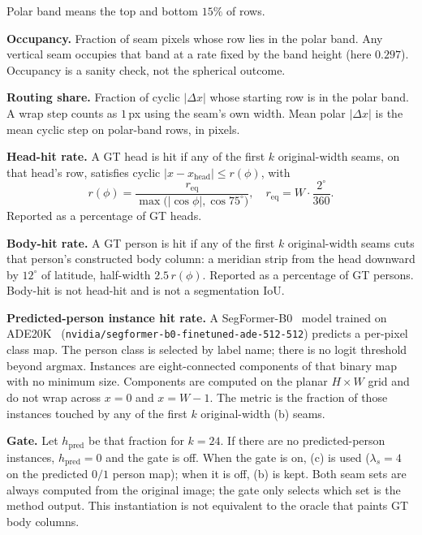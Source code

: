 \documentclass[conference,a4paper]{IEEEtran}
\begin{document}
Polar band means the top and bottom $15\%$ of rows.

\textbf{Occupancy.}
Fraction of seam pixels whose row lies in the polar band.
Any vertical seam occupies that band at a rate fixed by the band
height (here $0.297$). Occupancy is a sanity check, not the
spherical outcome.

\textbf{Routing share.}
Fraction of cyclic $|\Delta x|$ whose starting row is in the
polar band. A wrap step counts as $1$\,px using the seam's own
width. Mean polar $|\Delta x|$ is the mean cyclic step on
polar-band rows, in pixels.

\textbf{Head-hit rate.}
A GT head is hit if any of the first $k$ original-width seams,
on that head's row, satisfies cyclic
$|x-x_{\mathrm{head}}|\le r(\phi)$, with
\begin{equation}
r(\phi)=\frac{r_{\mathrm{eq}}}{\max\bigl(|\cos\phi|,\cos 75^\circ\bigr)},
\quad
r_{\mathrm{eq}}=W\cdot\frac{2^\circ}{360}.
\end{equation}
Reported as a percentage of GT heads.

\textbf{Body-hit rate.}
A GT person is hit if any of the first $k$ original-width seams
cuts that person's constructed body column: a meridian strip from
the head downward by $12^\circ$ of latitude, half-width
$2.5\,r(\phi)$. Reported as a percentage of GT persons. Body-hit
is not head-hit and is not a segmentation IoU.

\textbf{Predicted-person instance hit rate.}
A SegFormer-B0~\cite{xie2021segformer} model trained on
{ADE20K}~\cite{zhou2017ade20k}
(\texttt{nvidia/segformer-b0-finetuned-ade-512-512}) predicts a
per-pixel class map. The person class is selected by label name;
there is no logit threshold beyond $\mathrm{argmax}$. Instances
are eight-connected components of that binary map with no minimum
size. Components are computed on the planar $H\times W$ grid and
do not wrap across $x=0$ and $x=W-1$. The metric is the fraction
of those instances touched by any of the first $k$ original-width
(b) seams.

\textbf{Gate.}
Let $h_{\mathrm{pred}}$ be that fraction for $k=24$. If there are
no predicted-person instances, $h_{\mathrm{pred}}=0$ and the gate
is off. When the gate is on, (c) is used ($\lambda_s=4$ on the
predicted $0/1$ person map); when it is off, (b) is kept. Both
seam sets are always computed from the original image; the gate
only selects which set is the method output. This instantiation
is not equivalent to the oracle that paints GT body columns.
\end{document}
